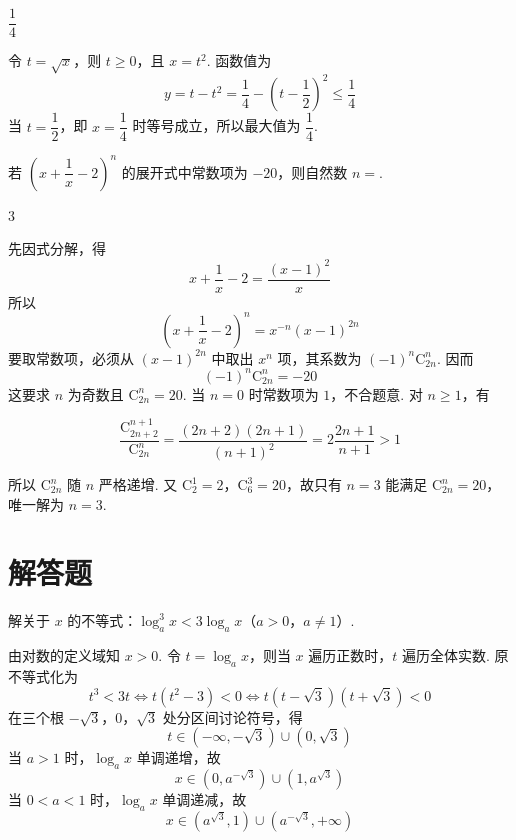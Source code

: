 \begin{answer}
\(\dfrac14\)
\end{answer}

\begin{solution}
令 \(t=\sqrt{x}\)，则 \(t\geqslant0\)，且 \(x=t^2\). 函数值为
\[
y=t-t^2=\frac14-\left(t-\frac12\right)^2\leqslant\frac14
\]
当 \(t=\dfrac12\)，即 \(x=\dfrac14\) 时等号成立，所以最大值为 \(\dfrac14\).
\end{solution}

\begin{problem}
若 \(\left(x+\dfrac1x-2\right)^n\) 的展开式中常数项为 \(-20\)，则自然数 \(n=\)\fillinblank{}.
\end{problem}

\begin{answer}
\(3\)
\end{answer}

\begin{solution}
先因式分解，得
\[
x+\frac1x-2=\frac{(x-1)^2}{x}
\]
所以
\[
\left(x+\frac1x-2\right)^n=x^{-n}(x-1)^{2n}
\]
要取常数项，必须从 \((x-1)^{2n}\) 中取出 \(x^n\) 项，其系数为 \((-1)^n\mathrm C_{2n}^n\). 因而
\[
(-1)^n\mathrm C_{2n}^n=-20
\]
这要求 \(n\) 为奇数且 \(\mathrm C_{2n}^n=20\). 当 \(n=0\) 时常数项为 \(1\)，不合题意. 对 \(n\geqslant1\)，有

\[
\frac{\mathrm C_{2n+2}^{n+1}}{\mathrm C_{2n}^n}
=\frac{(2n+2)(2n+1)}{(n+1)^2}
=2\frac{2n+1}{n+1}>1
\]

所以 \(\mathrm C_{2n}^n\) 随 \(n\) 严格递增. 又 \(\mathrm C_2^1=2\)，\(\mathrm C_6^3=20\)，故只有 \(n=3\) 能满足 \(\mathrm C_{2n}^n=20\)，唯一解为 \(n=3\).
\end{solution}

\section{解答题}

\begin{problem}
解关于 \(x\) 的不等式：\(\log_a^3x<3\log_ax\)（\(a>0\)，\(a\ne1\)）.
\end{problem}

\begin{solution}
由对数的定义域知 \(x>0\). 令 \(t=\log_ax\)，则当 \(x\) 遍历正数时，\(t\) 遍历全体实数. 原不等式化为
\[
t^3<3t\Longleftrightarrow t(t^2-3)<0\Longleftrightarrow t(t-\sqrt3)(t+\sqrt3)<0
\]
在三个根 \(-\sqrt3\)，\(0\)，\(\sqrt3\) 处分区间讨论符号，得
\[
t\in(-\infty,-\sqrt3)\cup(0,\sqrt3)
\]
当 \(a>1\) 时，\(\log_a x\) 单调递增，故
\[
x\in(0,a^{-\sqrt3})\cup(1,a^{\sqrt3})
\]
当 \(0<a<1\) 时，\(\log_a x\) 单调递减，故
\[
x\in(a^{\sqrt3},1)\cup(a^{-\sqrt3},+\infty)
\]
\end{solution}

